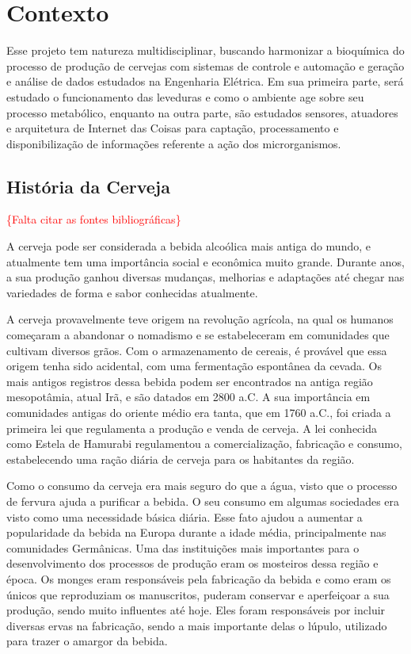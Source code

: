 \chapter{Contexto}

Esse projeto tem natureza multidisciplinar, buscando harmonizar a bioquímica do
processo de produção de cervejas com sistemas de controle e automação e
geração e análise de dados estudados na Engenharia Elétrica. Em sua primeira
parte, será estudado o funcionamento das leveduras e como o ambiente age sobre
seu processo metabólico, enquanto na outra parte, são estudados sensores,
atuadores e arquitetura de Internet das Coisas para captação, processamento e
disponibilização de informações referente a ação dos microrganismos.

\section{História da Cerveja}

\textcolor{red}{\{Falta citar as fontes bibliográficas\}}

A cerveja pode ser considerada a bebida alcoólica mais antiga do mundo, e atualmente tem uma importância social e econômica muito grande. Durante anos, a sua produção ganhou diversas mudanças, melhorias e adaptações até chegar nas variedades de forma e sabor conhecidas atualmente. 


A cerveja provavelmente teve origem na revolução agrícola, na qual os humanos começaram a abandonar o nomadismo e se estabeleceram em comunidades que cultivam diversos grãos. Com o armazenamento de cereais, é provável que essa origem tenha sido acidental, com uma fermentação espontânea da cevada. Os mais antigos registros dessa bebida podem ser encontrados na antiga região mesopotâmia, atual Irã, e são datados em 2800 a.C. A sua importância em comunidades antigas do oriente médio era tanta, que em 1760 a.C., foi criada a primeira lei que regulamenta a produção e venda de cerveja. A lei conhecida como Estela de Hamurabi regulamentou a comercialização, fabricação e consumo, estabelecendo uma ração diária de cerveja para os habitantes da região. 


Como o consumo da cerveja era mais seguro do que a água, visto que o processo de fervura ajuda a purificar a bebida. O  seu consumo em algumas sociedades era visto como uma necessidade básica diária. Esse fato ajudou a aumentar a popularidade da bebida na Europa durante a idade média, principalmente nas comunidades Germânicas. Uma das instituições mais importantes para o desenvolvimento dos processos de produção eram os mosteiros dessa região e época. Os monges eram responsáveis pela fabricação da bebida e como eram os únicos que reproduziam os manuscritos, puderam conservar e aperfeiçoar a sua produção, sendo muito influentes até hoje. Eles foram responsáveis por incluir diversas ervas na fabricação, sendo a mais importante delas o lúpulo, utilizado para trazer o amargor da bebida. 


